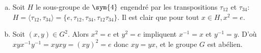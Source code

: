 \begin{enumerate}[a)]
\item Soit $H$ le sous-groupe de $\sym{4}$ engendré par les transpositions
$\tau_{12}$ et $\tau_{34}$:
$H=\langle\tau_{12},\tau_{34}\rangle=\{e,\tau_{12},\tau_{34},
\tau_{12}\tau_{34}\}$. Il est clair que pour tout $x\in H, x^2=e$.

\item Soit $(x,y)\in G^2$. Alors $x^2=e$ et $y^2=e$ impliquent $x^{-1}=x$ et
$y^{-1}=y$.  D'où $xyx^{-1}y^{-1}=xyxy=(xy)^2=e$ donc $xy=yx$, et le groupe $G$
est abélien.
\end{enumerate}
